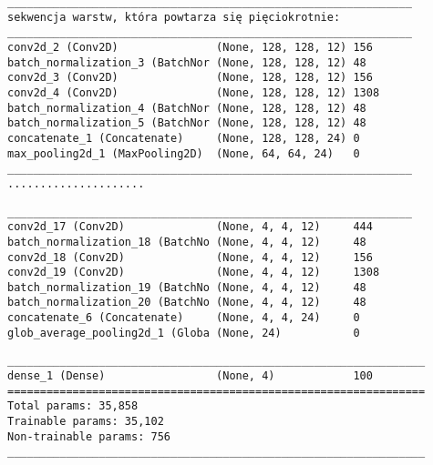 \newsavebox\myvvv
\begin{lrbox}{\myvvv}\begin{minipage}{1.0\textwidth}
\begin{verbatim}
______________________________________________________________
sekwencja warstw, która powtarza się pięciokrotnie:
______________________________________________________________
conv2d_2 (Conv2D)               (None, 128, 128, 12) 156       
batch_normalization_3 (BatchNor (None, 128, 128, 12) 48                   
conv2d_3 (Conv2D)               (None, 128, 128, 12) 156       
conv2d_4 (Conv2D)               (None, 128, 128, 12) 1308        
batch_normalization_4 (BatchNor (None, 128, 128, 12) 48                    
batch_normalization_5 (BatchNor (None, 128, 128, 12) 48                     
concatenate_1 (Concatenate)     (None, 128, 128, 24) 0       
max_pooling2d_1 (MaxPooling2D)  (None, 64, 64, 24)   0            
______________________________________________________________
.....................
\end{verbatim} 
\end{minipage}\end{lrbox}
\resizebox{0.75\textwidth}{!}{\usebox\myvvv}

\newsavebox\myvvvv
\begin{lrbox}{\myvvvv}\begin{minipage}{1.0\textwidth}
\begin{verbatim}
______________________________________________________________
conv2d_17 (Conv2D)              (None, 4, 4, 12)     444         
batch_normalization_18 (BatchNo (None, 4, 4, 12)     48             
conv2d_18 (Conv2D)              (None, 4, 4, 12)     156     
conv2d_19 (Conv2D)              (None, 4, 4, 12)     1308   
batch_normalization_19 (BatchNo (None, 4, 4, 12)     48                
batch_normalization_20 (BatchNo (None, 4, 4, 12)     48                 
concatenate_6 (Concatenate)     (None, 4, 4, 24)     0       
glob_average_pooling2d_1 (Globa (None, 24)           0             
\end{verbatim} 
\end{minipage}\end{lrbox}
\resizebox{0.75\textwidth}{!}{\usebox\myvvvv}

\newsavebox\myvvvvv
\begin{lrbox}{\myvvvvv}\begin{minipage}{1.0\textwidth}
\begin{verbatim}
________________________________________________________________
dense_1 (Dense)                 (None, 4)            100    
================================================================
Total params: 35,858
Trainable params: 35,102
Non-trainable params: 756
________________________________________________________________
\end{verbatim} 
\end{minipage}\end{lrbox}
\resizebox{0.75\textwidth}{!}{\usebox\myvvvvv}

